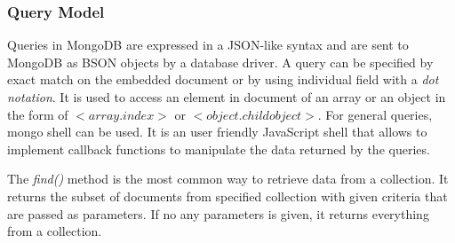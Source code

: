 \subsubsection{Query Model} \label{mongo-query-model}

Queries in MongoDB are expressed in a JSON-like syntax and are sent to MongoDB as BSON objects by a database driver\citep{orend2010analysis}. A query can be specified by exact match on the embedded document or by using individual field with a \textit{dot notation}. It is used to access an element in document of an array or an object in the form of  $<$$array$.$index$$>$ or  $<$$object$.$childobject$$>$. For general queries, mongo shell can be used. It is an user friendly JavaScript shell that allows to implement callback functions to manipulate the data returned by the queries.  

The \textit{find()} method is the most common way to retrieve data from a collection. It returns the subset of documents from specified collection with given criteria that are passed as parameters. If no any parameters is given, it returns everything from a collection.  

